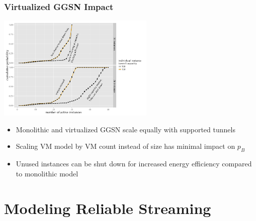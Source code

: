 \documentclass{beamer}
\begin{document}





\begin{frame}
	\frametitle{Virtualized GGSN Impact}

	\begin{center}
		\includegraphics[height=5cm]{extras/R-virtualized-instanceuse.pdf}
	\end{center}

	\begin{itemize}
		\item Monolithic and virtualized GGSN scale equally with supported tunnels
		\item Scaling VM model by VM count instead of size has minimal impact on $p_B$
		\item Unused instances can be shut down for increased energy efficiency compared to monolithic model
	\end{itemize}
\end{frame}





\section{Modeling Reliable Streaming}
\end{document}
